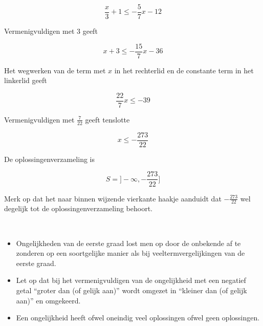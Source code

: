 \begin{voorbeeld}
	

\[ \frac{x}{3}+1 \leq -\frac{5}{7}x-12 \]

Vermenigvuldigen met $3$ geeft

\[ x+3 \leq -\frac{15}{7}x-36 \]

Het wegwerken van de term met $x$ in het rechterlid en de constante term in het linkerlid geeft

\[ \frac{22}{7}x \leq -39 \]

Vermenigvuldigen met $\frac{7}{22}$ geeft tenslotte

\[ x \leq -\frac{273}{22} \]

De oplossingenverzameling is

\[ S=]-\infty, -\frac{273}{22} ] \]

Merk op dat het naar binnen wijzende vierkante haakje aanduidt dat $-\frac{273}{22}$ wel degelijk tot de oplossingenverzameling behoort.

\end{voorbeeld}

\begin{ftonthoud}
	\ \\
	\begin{itemize}
\item Ongelijkheden van de eerste graad lost men op door de onbekende af te zonderen op een soortgelijke manier als bij veeltermvergelijkingen van de eerste graad.
\item Let op dat bij het vermenigvuldigen van de ongelijkheid met een negatief getal ``groter dan (of gelijk aan)'' wordt omgezet in ``kleiner dan (of gelijk aan)'' en omgekeerd.
\item Een ongelijkheid heeft ofwel oneindig veel oplossingen ofwel geen oplossingen.
\end{itemize}
\end{ftonthoud}
